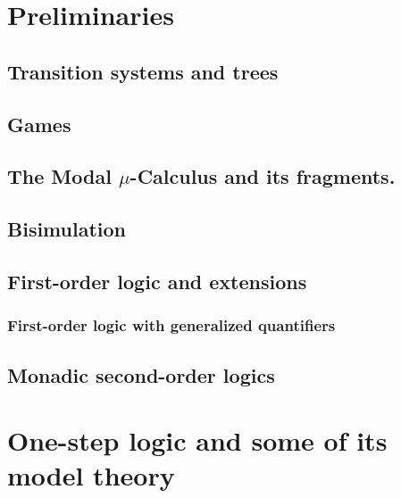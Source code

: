 \documentclass[prodmode,acmtecs]{acmsmall} %
\begin{document}
\clearpage


\section{Preliminaries}\label{sec:prel}

\subsection{Transition systems and trees} \label{ssec:prelim_trees}

\subsection{Games}



\subsection{The Modal $\mu$-Calculus and its fragments.}\label{subsec:mu}



\subsection{Bisimulation}


\subsection{First-order logic and extensions}

\subsubsection{First-order logic with generalized quantifiers}

%

\subsection{Monadic second-order logics}\label{sec:prel-so}


\clearpage

\section{One-step logic and some of its model theory}\label{sec:onestep}

\clearpage
\end{document}
